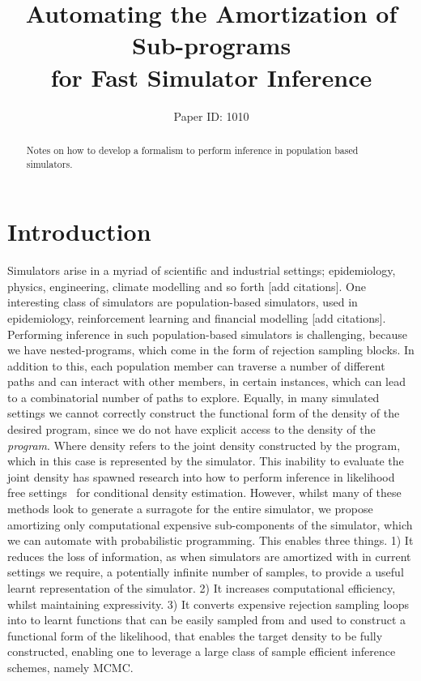 \documentclass{article}
\title{Automating the Amortization of Sub-programs \\ for Fast Simulator Inference}
\author{%
Paper ID: 1010 }
\begin{document}

\maketitle

\begin{abstract}

    Notes on how to develop a formalism to perform inference in population based simulators.
\end{abstract}

\section{Introduction}
\label{sec:intro}
Simulators arise in a myriad of scientific and industrial settings; epidemiology, physics, engineering, climate modelling and so forth [add citations].
One interesting class of simulators are population-based simulators, used in epidemiology, reinforcement learning
and financial modelling [add citations].
Performing inference in such population-based simulators is challenging, because we have nested-programs, 
which come in the form of rejection sampling blocks. 
In addition to this, each population member can traverse a number of different paths and 
can interact with other members, in certain instances, which can lead to a combinatorial number of paths 
to explore. 
Equally, in many simulated settings we cannot correctly construct the functional form of the density of the desired program,
since we do not have explicit access to the density of the \emph{program}.
Where density refers to the joint density constructed by the program, which in this case is represented by the simulator.
This inability to evaluate the joint density has spawned research into how to perform 
inference in likelihood free settings~\cite{greenberg2019automatic, mohamed2016learning, papamakarios2018sequential,brehmer2018mining}
for conditional density estimation. However, whilst many of these methods look to generate a surragote 
for the entire simulator, we propose amortizing only computational expensive sub-components 
of the simulator, which we can automate with probabilistic programming. 
This enables three things. 
1) It reduces the loss of information, as when simulators are amortized with in current
settings we require, a potentially infinite number of samples, to provide a useful learnt representation of the simulator. 
2) It increases computational efficiency, whilst maintaining expressivity. 
3) It converts expensive rejection sampling loops into to learnt functions that can be 
easily sampled from and used to construct a functional form of the likelihood, that enables the 
target density to be fully constructed, enabling one to leverage a large class of sample efficient inference schemes, namely MCMC.
\end{document}
